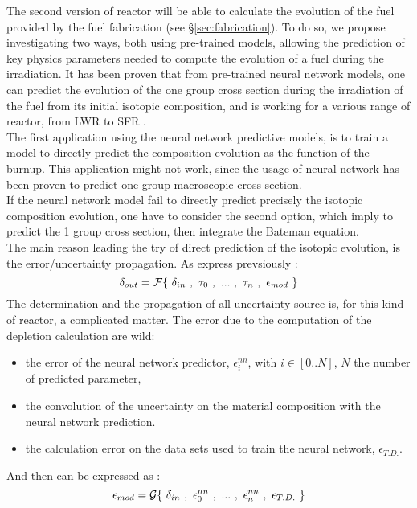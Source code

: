 \documentclass[dvips,12pt]{article}
\begin{document}

The second version of reactor will be able to calculate the evolution of the fuel provided by the fuel fabrication (see \S \ref{sec:fabrication}).
To do so, we propose investigating two ways, both using pre-trained models, allowing the prediction of key physics parameters needed to compute the evolution of a fuel during the irradiation. It has been proven that from pre-trained neural network models, one can predict the evolution of the one group cross section during the irradiation of the fuel from its initial isotopic composition, and is working for a various range of reactor, from LWR to SFR \cite{Leniau Neural networks, Leniau.PHYSOR.2016}.\\
The first application using the neural network predictive models, is to train a model to directly predict the composition evolution as the function of the burnup. This application might not work, since the usage of neural network has been proven to predict one group macroscopic cross section.\\
If the neural network model fail to directly predict precisely the isotopic composition evolution, one have to consider the second option, which imply to predict the 1 group cross section, then integrate the Bateman equation.\\

The main reason leading the try of direct prediction of the isotopic evolution, is the error/uncertainty propagation. As express prevsiously :\begin{equation}
\delta_{out} = {\cal F}\{~\delta _{in}~,~\tau_0~,~...~,~\tau_n~,~\epsilon_{mod}~\}
\end{equation}
The determination and the propagation of all uncertainty source is, for this kind of reactor, a complicated matter. The error due to the computation of the depletion calculation are wild:
\begin{itemize}
\item the error of the neural network predictor, $\epsilon^{nn}_{i}$, with $i\in[0..N]$, $N$ the number of predicted parameter, 
\item the convolution of the uncertainty on the material composition with the neural network prediction. 
\item the calculation error on the data sets used to train the neural network, $\epsilon_{T.D.}$.
\end{itemize}
And then can be expressed as :
\begin{equation}
\epsilon_{mod} = {\cal G}\{~\delta _{in}~,~\epsilon^{nn}_{0}~,~...~,~\epsilon^{nn}_{n}~,~\epsilon_{T.D.}~\}
\end{equation}
\end{document}
